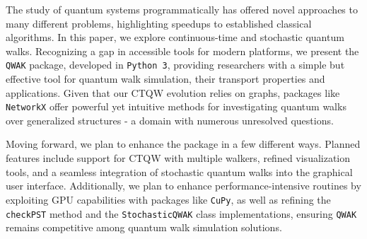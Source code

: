 \documentclass[../../main.tex]{subfiles}
\begin{document}
The study of quantum systems programmatically has offered novel approaches to
many different problems, highlighting speedups to established classical
algorithms. In this paper, we explore continuous-time and stochastic quantum
walks. Recognizing a gap in accessible tools for modern platforms, we present
the \texttt{QWAK} package, developed in \texttt{Python 3}, providing
researchers with a simple but effective tool for quantum walk simulation, their
transport properties and applications. Given that our CTQW evolution relies on
graphs, packages like \texttt{NetworkX} offer powerful yet intuitive 
methods for investigating quantum walks over generalized structures - a domain
with numerous unresolved questions.


Moving forward, we plan to enhance the package in a few different ways.
Planned features include support for CTQW with multiple walkers, refined
visualization tools, and a seamless integration of stochastic quantum walks
into the graphical user interface.  Additionally, we plan to enhance
performance-intensive routines by exploiting GPU capabilities with packages
like \texttt{CuPy}, as well as refining the \texttt{checkPST} method and the
\texttt{StochasticQWAK} class implementations, ensuring \texttt{QWAK} remains
competitive among quantum walk simulation solutions.
\end{document}
